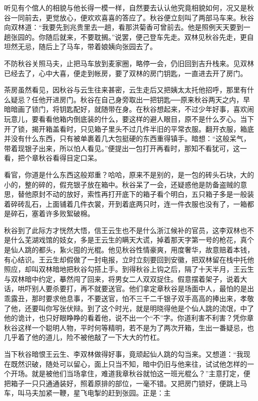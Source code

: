 \documentclass[12pt,UTF8]{ctexbook}
\begin{document}
{{{听见有个倌人的相貌与他长得一模一样，自然要去认认他究竟相貌如何，况又是秋谷一同前去，更觉放心，便欢欢喜喜的答应了。秋谷便立刻叫了两部马车来。秋谷向双林道：“我要先到兆贵里去一趟，看那洪菊香可曾前去。他是照例天天要到一趟张园的。你随后就来，不要耽搁。”说罢，便己登车先走。双林见秋谷先走，更自坦然无忌，随后上了马车，带着娘姨向张园去了。

不防秋谷关照马夫，止把马车放到麦家圈，略停一会，仍旧回到吉升栈来。见双林已经去了，心中大喜，便走到帐房，要了双林的房门钥匙，一直进去开了房门。

茶房虽然看见，因秋谷与云生往来甚密，云生走后又把姨太太托他招呼，那里有什么疑忌？任他开进房门。秋谷在自己身旁取出一把钥匙──原来秋谷两天之内，早暗暗画了锁门，将钥匙配好，就随带在身。在秋谷想起来，不过少年好事，喜欢闹玩意儿，要看看他箱内倒底装的什么，要这样的避人眼目，原不是什么歹心。当下开了锁，揭开箱盖看时，只见箱子里头不过几件半旧的平常衣服。翻开衣服，箱底并没有什么东西，只有被单裹着几大包挺硬的东西重得镇手。暗想：“这般呆气，带着现银子出来，所以怕人看见。”便提出一包打开再看时，那知不看犹可，这一看，把个章秋谷看得目定口呆。

看官，你道是什么东西这般郑重？哈哈，原来不是别的，是一包的砖头石块，大的小的，整的碎的，假充银子放在箱中。秋谷呆了一会，还疑惑他是防备盗贼的意思，替他原封不动的放好，索性再打开底下的箱子看个明白，五只箱子多是一般装着碎砖乱石，上面铺着几件衣裳，开到着底两只时，连一件衣服也没有了，一箱都是碎石，塞着许多败絮破棉。

秋谷到了此际方才恍然大悟，信王云生也不是什么浙江候补的官员，这李双林也不是什么芜湖戏馆的妓女，多是王云生的瞒天大谎，掉着那天字第一号的枪花，真个是仙人跳的都头，紥火囤的光棍。他见秋谷性情豪爽，用度奢华，故意赔着本钱，有心结识。王云生却假做了一封电报，立时立刻要回到安徽，把双林留在栈中托他照应，却叫双林暗地把秋谷勾搭上手。到得秋谷上钩之后，隔了十天半月，王云生与双林暗中约定，摹然闯了回来，将男女二人双双捉住。假意摆着架子，说着大话，哄吓别人要杀要打，再不就要送官。他们拿定章秋谷是场面中人，最怕的是出乖露丑，那时要求他息事，不要送官，怕不三千二千银子双手高高的捧出来，孝敬了他，还要叫你写张伏辩。到了这个时光，就是明晓得他是个仙人跳的流氓，中了他的诡计，也只好眼睁睁的看着他，说不出一个“不”字。你道利害不利害？凭你章秋谷这样一个聪明人物，平时何等精明，若不是为了两次开箱，生出一番疑忌，也几乎着了他的道儿，险不被他敲了一下大大的竹杠。

当下秋谷暗恨王云生、李双林做得好事，竟顽起仙人跳的勾当来。又想道：“我现在既然识破，随处可以留心，面上只当不知，暗中仍旧与他来往，试试他怎样的一个开场。就是被他们当场拿住，难道我章秋谷就怕这一班光棍么？”主意打定，便把箱子一只只通通装好，照着原排的部位，一毫不错。又把房门锁好，便跳上马车，叫马夫加紧一鞭，星飞电掣的赶到张园。正是：主

}}}
\end{document}
